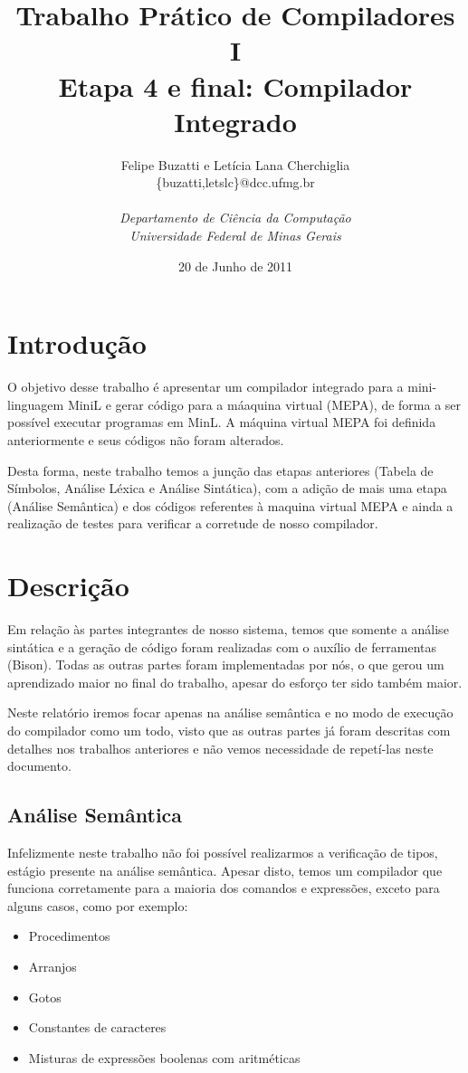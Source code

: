 \documentclass[a4paper,12pt]{article}
\title{\textbf{Trabalho Prático de Compiladores I \\ Etapa 4 e final: Compilador Integrado}}
\author{
        Felipe Buzatti e Letícia Lana Cherchiglia \\
	\{buzatti,letslc\}@dcc.ufmg.br \\ \\
        \textit{Departamento de Ciência da Computação}\\
        \textit{Universidade Federal de Minas Gerais}\\
}
\date{20 de Junho de 2011}
\begin{document}
\maketitle

\section{Introdução}
\label{intro}

O objetivo desse trabalho é apresentar um compilador integrado para a mini-linguagem MiniL e gerar código para a máaquina virtual (MEPA), de forma a ser possível executar programas em MinL. A máquina virtual MEPA foi definida anteriormente e seus códigos não foram alterados.

Desta forma, neste trabalho temos a junção das etapas anteriores (Tabela de Símbolos, Análise Léxica e Análise Sintática), com a adição de mais uma etapa (Análise Semântica) e dos códigos referentes à maquina virtual MEPA e ainda a realização de testes para verificar a corretude de nosso compilador.

\section{Descrição}
Em relação às partes integrantes de nosso sistema, temos que somente a análise sintática e a geração de código foram realizadas com o auxílio de ferramentas (Bison). Todas as outras partes foram implementadas por nós, o que gerou um aprendizado maior no final do trabalho, apesar do esforço ter sido também maior. 

Neste relatório iremos focar apenas na análise semântica e no modo de execução do compilador como um todo, visto que as outras partes já foram descritas com detalhes nos trabalhos anteriores e não vemos necessidade de repetí-las neste documento.

\subsection{Análise Semântica}
Infelizmente neste trabalho não foi possível realizarmos a verificação de tipos, estágio presente na análise semântica. Apesar disto, temos um compilador que funciona corretamente para a maioria dos comandos e expressões, exceto para alguns casos, como por exemplo:

\begin{itemize}
 \item Procedimentos
 \item Arranjos
 \item Gotos
 \item Constantes de caracteres
 \item Misturas de expressões boolenas com aritméticas
\end{itemize}
\end{document}
